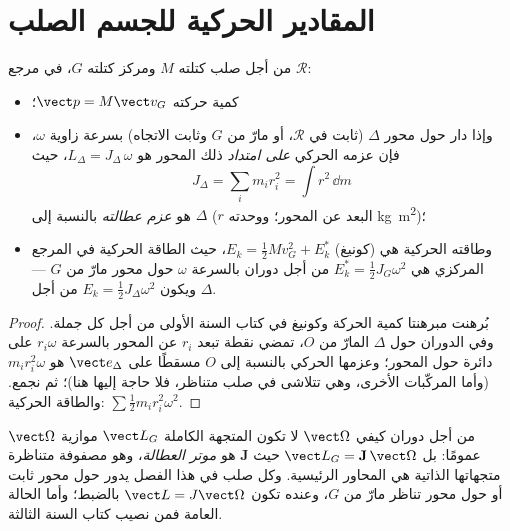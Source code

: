 \section{المقادير الحركية للجسم الصلب}

\begin{proposition}\label{prop:b2:rigid-body-mechanics:kinetic}
من أجل صلب كتلته $M$ ومركز كتلته $G$، في مرجع $\mathcal R$:
\begin{itemize}
  \item كمية حركته $\vect p = M\vect v_G$؛
  \item وإذا دار حول محور $\Delta$ (ثابت في $\mathcal R$، أو مارّ من
        $G$ وثابت الاتجاه) بسرعة زاوية $\omega$، فإن عزمه الحركي
        \emph{على امتداد} ذلك المحور هو
        $L_\Delta = J_\Delta\,\omega$، حيث
        \[
        J_\Delta = \sum_i m_i r_i^2 = \int r^2\,\dd m
        \]
        هو \emph{عزم عطالته} بالنسبة إلى $\Delta$ ($r$ البعد عن
        المحور؛ ووحدته \unit{kg.m^2})؛
  \item وطاقته الحركية هي (كونيغ) $E_k = \tfrac12Mv_G^2 +
        E_k^*$، حيث الطاقة الحركية في المرجع المركزي هي
        $E_k^* = \tfrac12J_{G}\omega^2$ من أجل دوران بالسرعة $\omega$ حول
        محور مارّ من $G$ --- ويكون $E_k = \tfrac12J_\Delta\omega^2$ من أجل
         $\Delta$.
\end{itemize}
\end{proposition}

\begin{proof}
بُرهنت مبرهنتا كمية الحركة وكونيغ في كتاب السنة الأولى من أجل
كل جملة. وفي الدوران حول $\Delta$ المارّ من $O$، تمضي نقطة تبعد
$r_i$ عن المحور بالسرعة $r_i\omega$ على دائرة حول المحور؛ وعزمها
الحركي بالنسبة إلى $O$ مسقطًا على $\vect e_\Delta$ هو
$m_ir_i^2\omega$ (وأما المركّبات الأخرى، وهي تتلاشى في صلب متناظر،
فلا حاجة إليها هنا)؛ ثم نجمع. والطاقة الحركية: $\sum\tfrac12m_ir_i^2
\omega^2$.
\end{proof}

\begin{remark}[ما نسلّم به]\label{rem:b2:rigid-body-mechanics:tensor}
من أجل دوران كيفي $\vect\Omega$ لا تكون المتجهة الكاملة $\vect L_G$
موازية $\vect\Omega$ عمومًا: بل $\vect L_G = \mathbf J\,\vect\Omega$
حيث $\mathbf J$ هو \emph{موتر العطالة}، وهو مصفوفة متناظرة متجهاتها
الذاتية هي المحاور الرئيسية. وكل صلب في هذا الفصل يدور حول
محور ثابت أو حول محور تناظر مارّ من $G$، وعنده تكون
$\vect L = J\vect\Omega$ بالضبط؛ وأما الحالة العامة فمن نصيب كتاب
السنة الثالثة.
\end{remark}

